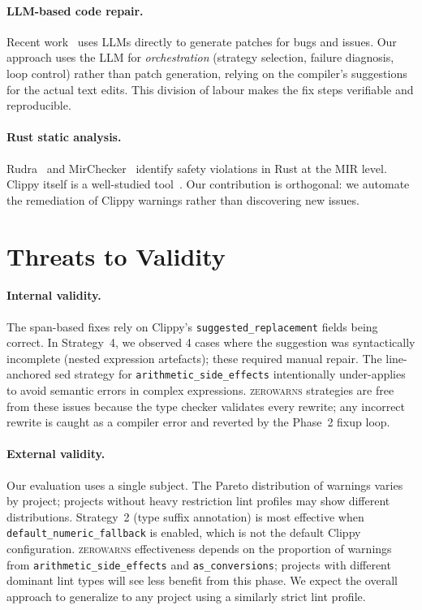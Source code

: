 \documentclass[sigconf,review,anonymous]{acmart}
\newcommand{\zerowarns}{\textsc{zerowarns}\xspace}
\begin{document}
\paragraph{LLM-based code repair.}
Recent work~\cite{xia2023automated,jimenez2024swebench} uses LLMs directly
to generate patches for bugs and issues.
Our approach uses the LLM for \emph{orchestration} (strategy selection,
failure diagnosis, loop control) rather than patch generation, relying on
the compiler's suggestions for the actual text edits.
This division of labour makes the fix steps verifiable and reproducible.

\paragraph{Rust static analysis.}
Rudra~\cite{bae2021rudra} and MirChecker~\cite{li2021mirchecker} identify
safety violations in Rust at the MIR level.
Clippy itself is a well-studied tool~\cite{balasubramanian2017system}.
Our contribution is orthogonal: we automate the remediation of Clippy
warnings rather than discovering new issues.

\section{Threats to Validity}\label{sec:threats}

\paragraph{Internal validity.}
The span-based fixes rely on Clippy's \texttt{suggested\_replacement} fields
being correct.
In Strategy~4, we observed 4 cases where the suggestion was syntactically
incomplete (nested expression artefacts); these required manual repair.
The line-anchored sed strategy for \texttt{arithmetic\_side\_effects}
intentionally under-applies to avoid semantic errors in complex expressions.
\zerowarns strategies are free from these issues because the type checker
validates every rewrite; any incorrect rewrite is caught as a compiler error
and reverted by the Phase~2 fixup loop.

\paragraph{External validity.}
Our evaluation uses a single subject.
The Pareto distribution of warnings varies by project; projects without
heavy restriction lint profiles may show different distributions.
Strategy~2 (type suffix annotation) is most effective when
\texttt{default\_numeric\_fallback} is enabled, which is not the default
Clippy configuration.
\zerowarns effectiveness depends on the proportion of warnings from
\texttt{arithmetic\_side\_effects} and \texttt{as\_conversions}; projects
with different dominant lint types will see less benefit from this phase.
We expect the overall approach to generalize to any project using a similarly
strict lint profile.
\end{document}
